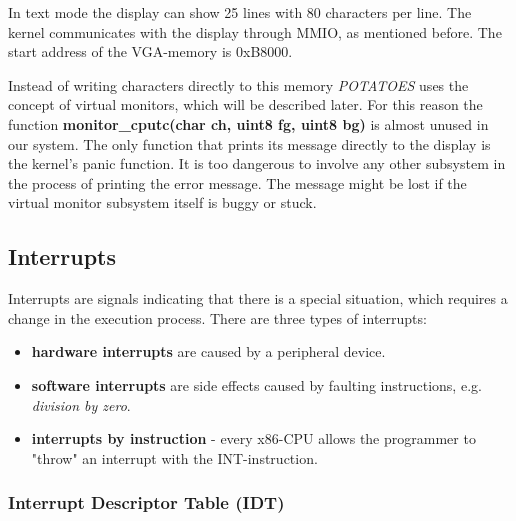\documentclass[11pt,a4paper]{scrartcl}
\begin{document}
In text mode the display can show 25 lines with 80 characters per line. The kernel communicates with the display through MMIO, as mentioned before. The start address of the VGA-memory is 0xB8000.

Instead of writing characters directly to this memory \textit{POTATOES} uses the concept of virtual monitors, which will be described later. For this reason the function \textbf{monitor\_cputc(char ch, uint8 fg, uint8 bg)} is almost unused in our system. The only function that prints its message directly to the display is the kernel's panic function. It is too dangerous to involve any other subsystem in the process of printing the error message. The message might be lost if the virtual monitor subsystem itself is buggy or stuck.

\subsection{Interrupts}

Interrupts are signals indicating that there is a special situation, which requires a change in the execution process. There are three types of interrupts:
\begin{itemize}
\item \textbf{hardware interrupts} are caused by a peripheral device.
\item \textbf{software interrupts} are side effects caused by faulting instructions, e.g. \textit{division by zero}.
\item \textbf{interrupts by instruction} - every x86-CPU allows the programmer to "throw" an interrupt with the INT-instruction.
\end{itemize}

\subsubsection{Interrupt Descriptor Table (IDT)}
\end{document}
